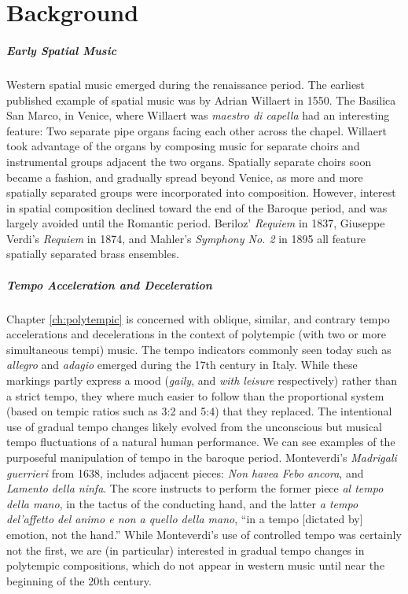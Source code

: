 \clearpage
\chapter{Background}
\label{ch:background}

\paragraph{Early Spatial Music} Western spatial music emerged during
the renaissance period. The earliest published example of spatial
music was by Adrian Willaert in 1550.\cite{Zvonar1999} The Basilica
San Marco, in Venice, where Willaert was \textit{maestro di capella}
had an interesting feature: Two separate pipe organs facing each other
across the chapel. Willaert took advantage of the organs by composing
music for separate choirs and instrumental groups adjacent the two
organs. Spatially separate choirs soon became a fashion, and gradually
spread beyond Venice, as more and more spatially separated groups were
incorporated into composition. However, interest in spatial
composition declined toward the end of the Baroque period, and was
largely avoided until the Romantic period. Beriloz' \textit{Requiem}
in 1837, Giuseppe Verdi's \textit{Requiem} in 1874, and Mahler's
\textit{Symphony No. 2} in 1895 all feature spatially separated brass
ensembles.

\paragraph{Tempo Acceleration and Deceleration}
Chapter \ref{ch:polytempic}   is concerned with oblique, similar, and contrary
tempo accelerations and decelerations in the context of polytempic
(with two or more simultaneous tempi) music.  The tempo indicators
commonly seen today such as \textit{allegro} and \textit{adagio} emerged
during the 17th century in Italy. While these markings partly express
a mood (\textit{gaily}, and \textit{with leisure} respectively) rather
than a strict tempo, they where much easier to follow than the
proportional system (based on tempic ratios such as 3:2 and 5:4) that
they replaced.\cite{Sachs1953} The intentional use of gradual tempo
changes likely evolved from the unconscious but musical tempo
fluctuations of a natural human performance. We can see examples of
the purposeful manipulation of tempo in the baroque
period. Monteverdi's \textit{Madrigali guerrieri} from 1638, includes
adjacent pieces: \textit{Non havea Febo ancora}, and \textit{Lamento
  della ninfa}. The score instructs to perform the former piece
\textit{al tempo della mano}, in the tactus of the conducting hand,
and the latter \textit{a tempo del'affetto del animo e non a quello
  della mano}, ``in a tempo [dictated by] emotion, not the hand.''
While Monteverdi's use of controlled tempo was certainly not the
first, we are (in particular) interested in gradual tempo changes in
polytempic compositions, which do not appear in western music until
near the beginning of the 20th century.

